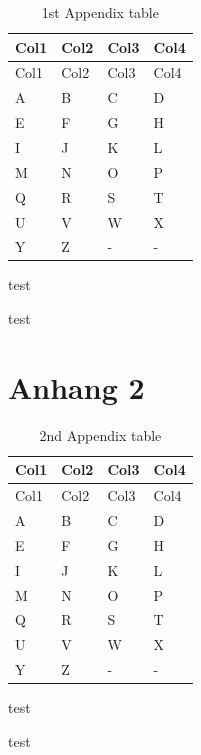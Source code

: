 \documentclass[
  11pt,
]{scrbook}
\begin{document}
\hypertarget{tbl-letters-full}{}
\begin{longtable}[]{@{}llll@{}}
\caption{\label{tbl-letters-full}1st Appendix table}\tabularnewline
\toprule\noalign{}
Col1 & Col2 & Col3 & Col4 \\
\midrule\noalign{}
\endfirsthead
\toprule\noalign{}
Col1 & Col2 & Col3 & Col4 \\
\midrule\noalign{}
\endhead
\bottomrule\noalign{}
\endlastfoot
A & B & C & D \\
E & F & G & H \\
I & J & K & L \\
M & N & O & P \\
Q & R & S & T \\
U & V & W & X \\
Y & Z & - & - \\
\end{longtable}

\newpage{}

test

\newpage{}

test

\hypertarget{anhang-2}{%
\chapter{Anhang 2}\label{anhang-2}}

\setcounter{page}{1}

\hypertarget{tbl-letters2-full}{}
\begin{longtable}[]{@{}llll@{}}
\caption{\label{tbl-letters2-full}2nd Appendix table}\tabularnewline
\toprule\noalign{}
Col1 & Col2 & Col3 & Col4 \\
\midrule\noalign{}
\endfirsthead
\toprule\noalign{}
Col1 & Col2 & Col3 & Col4 \\
\midrule\noalign{}
\endhead
\bottomrule\noalign{}
\endlastfoot
A & B & C & D \\
E & F & G & H \\
I & J & K & L \\
M & N & O & P \\
Q & R & S & T \\
U & V & W & X \\
Y & Z & - & - \\
\end{longtable}

\newpage{}

test

\newpage{}

test


\backmatter
\end{document}
